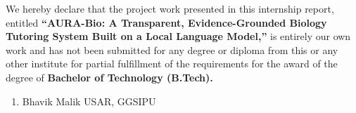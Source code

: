 
\vspace{1cm}

We hereby declare that the project work presented in this internship report, entitled \textbf{``AURA-Bio: A Transparent, Evidence-Grounded Biology Tutoring System Built on a Local Language Model,''} is entirely our own work and has not been submitted for any degree or diploma from this or any other institute for partial fulfillment of the requirements for the award of the degree of \textbf{Bachelor of Technology (B.Tech).}

\vspace{1.5cm}

\begin{enumerate}
    \item Bhavik Malik \hspace{2cm} USAR, GGSIPU

    \vspace{0.8cm}

\end{enumerate}
